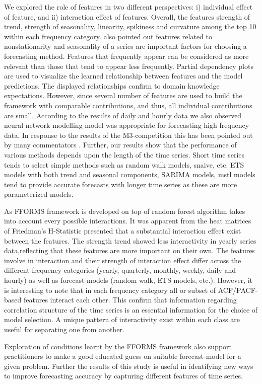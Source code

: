 \documentclass[11pt,a4paper,]{article}
\begin{document}
We explored the role of features in two different perspectives: i)
individual effect of feature, and ii) interaction effect of features.
Overall, the features strength of trend, strength of seasonality,
linearity, spikiness and curvature among the top 10 within each
frequency category. \textcite{lemke2010meta} also pointed out features
related to nonstationarity and seasonality of a series are important
factors for choosing a forecasting method. Features that frequently
appear can be considered as more relevant than those that tend to appear
less frequently. Partial dependency plots are used to visualize the
learned relationship between features and the model predictions. The
displayed relationships confirm to domain knowledge expectations.
However, since several number of features are used to build the
framework with comparable contributions, and thus, all individual
contributions are small. According to the results of daily and hourly
data we also observed neural network modelling model was appropriate for
forecasting high frequency data. In response to the results of the
M3-competition this has been pointed out by many commentators
\autocite{makridakis2000m3}. Further, our results show that the
performance of various methods depends upon the length of the time
series. Short time series tends to select simple methods such as random
walk models, snaive, etc. ETS models with both trend and seasonal
components, SARIMA models, mstl models tend to provide accurate
forecasts with longer time series as these are more parameterized
models.

As FFORMS framework is developed on top of random forest algorithm takes
into account every possible interactions. It was apparent from the heat
matrices of Friedman's H-Statistic presented that a substantial
interaction effect exist between the features. The strength trend showed
less interactivity in yearly series data,reflecting that these features
are more important on their own. The features involve in interaction and
their strength of interaction effect differ across the different
frequency categories (yearly, quarterly, monthly, weekly, daily and
hourly) as well as forecast-models (random walk, ETS models, etc.).
However, it is interesting to note that in each frequency category all
or subset of ACF/PACF-based features interact each other. This confirm
that information regarding correlation structure of the time series is
an essential information for the choice of model selection. A unique
pattern of interactivity exist within each class are useful for
separating one from another.

Exploration of conditions learnt by the FFORMS framework also support
practitioners to make a good educated guess on suitable forecast-model
for a given problem. Further the results of this study is useful in
identifying new ways to improve forecasting accuracy by capturing
different features of time series.

\printbibliography[title=References]
\end{document}
